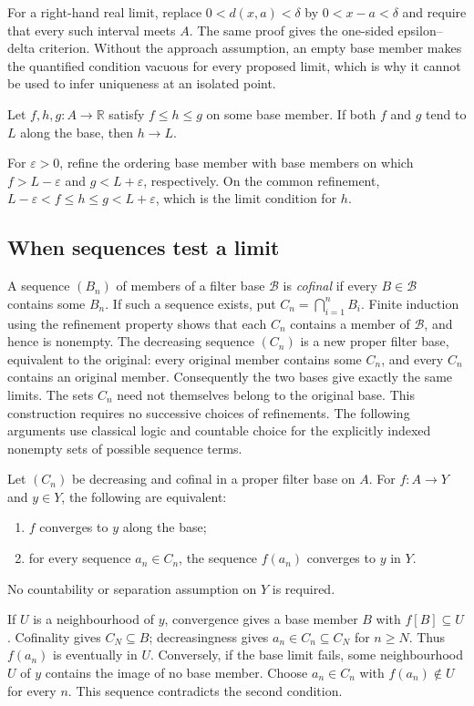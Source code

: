 For a right-hand real limit, replace $0<d(x,a)<\delta$ by
$0<x-a<\delta$ and require that every such interval meets $A$.
The same proof gives the one-sided epsilon--delta criterion. Without
the approach assumption, an empty base member makes the quantified
condition vacuous for every proposed limit, which is why it cannot
be used to infer uniqueness at an isolated point.

\begin{theorem}
Let $f,h,g:A\to\mathbb R$ satisfy $f\leq h\leq g$ on some base
member. If both $f$ and $g$ tend to $L$ along the base, then $h\to L$.
\end{theorem}
\Proof
For $\varepsilon>0$, refine the ordering base member with base members
on which $f>L-\varepsilon$ and $g<L+\varepsilon$, respectively.
On the common refinement,
$L-\varepsilon<f\leq h\leq g<L+\varepsilon$, which is the limit
condition for $h$.
\Done

\subsection{When sequences test a limit}
A sequence $(B_n)$ of members of a filter base $\mathcal B$ is
\emph{cofinal} if every $B\in\mathcal B$ contains some $B_n$.
If such a sequence exists, put $C_n=\bigcap_{i=1}^n B_i$.
Finite induction using the refinement property shows that each $C_n$
contains a member of $\mathcal B$, and hence is nonempty. The decreasing
sequence $(C_n)$ is a new proper filter base, equivalent to the original:
every original member contains some $C_n$, and every $C_n$ contains an
original member. Consequently the two bases give exactly the same limits.
The sets $C_n$ need not themselves belong to the original base. This
construction requires no successive choices of refinements. The following
arguments use classical logic and countable choice for the explicitly
indexed nonempty sets of possible sequence terms.

\begin{theorem}
Let $(C_n)$ be decreasing and cofinal in a proper filter base on $A$.
For $f:A\to Y$ and $y\in Y$, the following are equivalent:
\begin{enumerate}
\item $f$ converges to $y$ along the base;
\item for every sequence $a_n\in C_n$, the sequence $f(a_n)$ converges
      to $y$ in $Y$.
\end{enumerate}
No countability or separation assumption on $Y$ is required.
\end{theorem}
\Proof
If $U$ is a neighbourhood of $y$, convergence gives a base member
$B$ with $f[B]\subseteq U$. Cofinality gives $C_N\subseteq B$;
decreasingness gives $a_n\in C_n\subseteq C_N$ for $n\geq N$.
Thus $f(a_n)$ is eventually in $U$.
Conversely, if the base limit fails, some neighbourhood $U$ of $y$
contains the image of no base member. Choose $a_n\in C_n$ with
$f(a_n)\notin U$ for every $n$. This sequence contradicts the second
condition.
\Done

